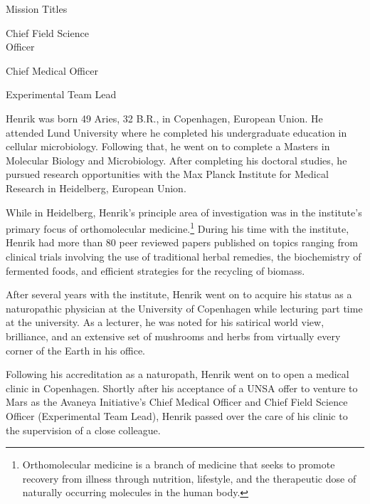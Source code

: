 {        \bTR
            \bTC Mission Titles \eTC
            \bTC 
                \startitemize[4]
                \startpacked
                \item Chief Field Science\\Officer
                \item Chief Medical Officer
                \item Experimental Team Lead
                \stoppacked
                \stopitemize
            \eTC
        \eTR
    \eTABLEbody

\eTABLE
}

Henrik was born 49 Aries, 32 B.R., in Copenhagen, European Union. He attended Lund University where he completed his undergraduate education in cellular microbiology. Following that, he went on to complete a Masters in Molecular Biology and Microbiology. After completing his doctoral studies, he pursued research opportunities with the Max Planck Institute for Medical Research in Heidelberg, European Union.

While in Heidelberg, Henrik's principle area of investigation was in the institute's primary focus of orthomolecular medicine.\footnote{Orthomolecular medicine is a branch of medicine that seeks to promote recovery from illness through nutrition, lifestyle, and the therapeutic dose of naturally occurring molecules in the human body.} During his time with the institute, Henrik had more than 80 peer reviewed papers published on topics ranging from clinical trials involving the use of traditional herbal remedies, the biochemistry of fermented foods, and efficient strategies for the recycling of biomass.

After several years with the institute, Henrik went on to acquire his status as a naturopathic physician at the University of Copenhagen while lecturing part time at the university. As a lecturer, he was noted for his satirical world view, brilliance, and an extensive set of mushrooms and herbs from virtually every corner of the Earth in his office.

Following his accreditation as a naturopath, Henrik went on to open a medical clinic in Copenhagen. Shortly after his acceptance of a UNSA offer to venture to Mars as the Avaneya Initiative's Chief Medical Officer and Chief Field Science Officer (Experimental Team Lead), Henrik passed over the care of his clinic to the supervision of a close colleague.


